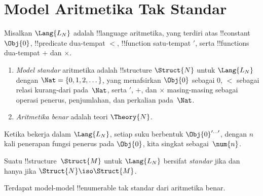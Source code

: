 \documentclass[../../../include/open-logic-section]{subfiles}
\begin{document}
\section{Model Aritmetika Tak Standar}

\begin{defn}
Misalkan $\Lang{L_N}$ adalah !!{language} aritmetika, yang terdiri atas
!!{constant} $\Obj{0}$, !!{predicate} dua-tempat $<$, !!{function}
satu-tempat $\prime$, serta !!{function}s dua-tempat $+$ dan $\times$.
\begin{enumerate}
\item \emph{Model standar} aritmetika adalah !!{structure} $\Struct{N}$
  untuk $\Lang{L_N}$ dengan $\Nat = \{0, 1, 2, \dots\}$, yang
  menafsirkan $\Obj{0}$ sebagai $0$, $<$ sebagai relasi kurang-dari
  pada~$\Nat$, serta $\prime$, $+$, dan $\times$ masing-masing sebagai
  operasi penerus, penjumlahan, dan perkalian pada~$\Nat$.
\item \emph{Aritmetika benar} adalah teori $\Theory{N}$.
\end{enumerate}
\end{defn}

Ketika bekerja dalam $\Lang{L_N}$, setiap suku berbentuk
$\Obj{0}^{\prime\dots\prime}$, dengan $n$ kali penerapan fungsi penerus
pada $\Obj{0}$, kita singkat sebagai~$\num{n}$.

\begin{defn}
Suatu !!{structure}~$\Struct{M}$ untuk $\Lang{L_N}$ bersifat
\emph{standar} jika dan hanya jika $\Struct{N} \iso \Struct{M}$.
\end{defn}

\begin{thm}
Terdapat model-model !!{enumerable} tak standar dari aritmetika benar.
\end{thm}
\end{document}
